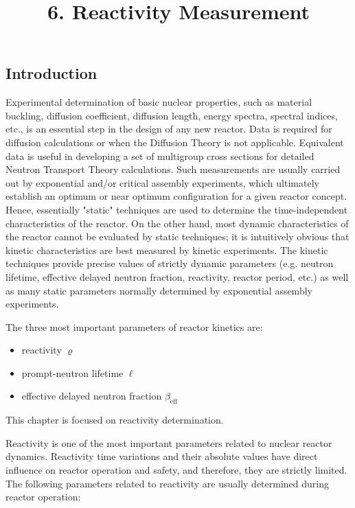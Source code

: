\documentclass[10pt]{article}
\title{6. Reactivity Measurement }
\author{}
\date{}
\begin{document}
\maketitle
\subsection{Introduction}
Experimental determination of basic nuclear properties, such as material buckling, diffusion coefficient, diffusion length, energy spectra, spectral indices, etc., is an essential step in the design of any new reactor. Data is required for diffusion calculations or when the Diffusion Theory is not applicable. Equivalent data is useful in developing a set of multigroup cross sections for detailed Neutron Transport Theory calculations. Such measurements are usually carried out by exponential and/or critical assembly experiments, which ultimately establish an optimum or near optimum configuration for a given reactor concept. Hence, essentially "static" techniques are used to determine the time-independent characteristics of the reactor. On the other hand, most dynamic characteristics of the reactor cannot be evaluated by static techniques; it is intuitively obvious that kinetic characteristics are best measured by kinetic experiments. The kinetic techniques provide precise values of strictly dynamic parameters (e.g. neutron lifetime, effective delayed neutron fraction, reactivity, reactor period, etc.) as well as many static parameters normally determined by exponential assembly experiments.

The three most important parameters of reactor kinetics are:

\begin{itemize}
  \item reactivity $\varrho$

  \item prompt-neutron lifetime $\ell$

  \item effective delayed neutron fraction $\beta_{\text {eff }}$

\end{itemize}

This chapter is focused on reactivity determination.

Reactivity is one of the most important parameters related to nuclear reactor dynamics. Reactivity time variations and their absolute values have direct influence on reactor operation and safety, and therefore, they are strictly limited. The following parameters related to reactivity are usually determined during reactor operation:
\end{document}
